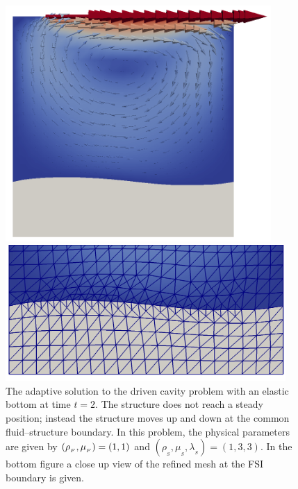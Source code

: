 \begin{figure}
\label{selim:fig:primal_cavity}
\caption{The adaptive solution to the driven cavity problem with an
  elastic bottom at time $t=2$. The structure does not reach a steady
  position; instead the structure moves up and down at the common
  fluid--structure boundary. In this problem, the physical parameters
  are given by $(\rho_{_{F}},\mu_{_{F}}) = (1, 1)$ and
  $(\rho_{_{S}},\mu_{_{S}}, \lambda_{_{S}}) = (1, 3, 3)$. In the
  bottom figure a close up view of the refined mesh at the FSI boundary is
  given.}
\includegraphics[width=0.9\textwidth]{chapters/selim/png/cavity_large.png}

\includegraphics[width=0.95\textwidth]{chapters/selim/png/zoom_cavity.png}
\end{figure}

